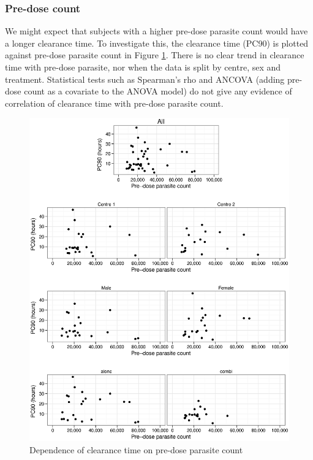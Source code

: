 \subsubsection*{Pre-dose count}
We might expect that subjects with a higher pre-dose parasite count would have a longer clearance time. To investigate this, the clearance time (PC90) is plotted against pre-dose parasite count in Figure \ref{predose-ancova}. There is no clear trend in clearance time with pre-dose parasite, nor when the data is split by centre, sex and treatment. Statistical tests such as Spearman's rho and ANCOVA (adding pre-dose count as a covariate to the ANOVA model) do not give any evidence of correlation of clearance time with pre-dose parasite count.
\begin{figure}[p]
\includegraphics[width=150mm]{predose-ancova.eps} 
\caption{Dependence of clearance time on pre-dose parasite count}
\label{predose-ancova}
\end{figure}

